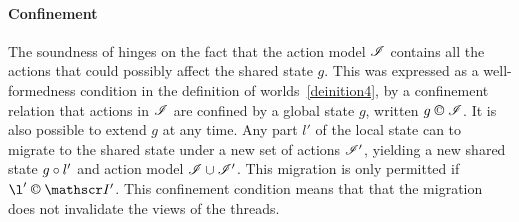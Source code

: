 

\paragraph{Confinement}

The soundness of \colosl hinges on the fact that the action model
$\mathscr{I}$ contains all the actions that could possibly affect the shared
state $g$. This was expressed as a well-formedness condition in the
definition of worlds~\ref{deinition4}, by a confinement relation that
actions in $\mathscr{I}$ are confined by a global state $g$, written $g
\confines \lmod$. It is also possible to extend $g$ at any time.  Any
part $l'$ of the local state can to migrate to the shared state under
a new set of actions $\mathscr{I}'$, yielding a new shared state $g\circ
l'$ and action model $\mathscr{I} \cup \mathscr{I}'$. This migration is only
permitted if $\l ' \confines \lmod'$. This confinement condition means
that that the migration does not invalidate the views  of the threads.


